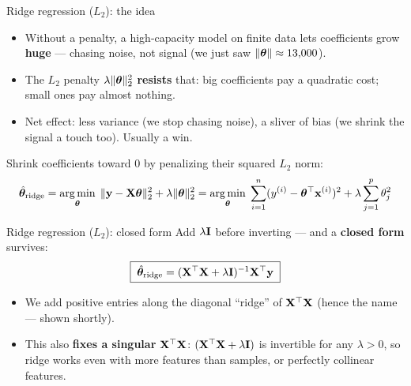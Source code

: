 \documentclass[aspectratio=169]{beamer}
\begin{document}
\begin{frame}{Ridge regression ($L_2$): the idea}
  \begin{itemize}
    \item Without a penalty, a high-capacity model on finite data lets coefficients grow \textbf{huge} --- chasing noise, not signal (we just saw $\|\bm{\theta}\| \approx 13{,}000$).
    \item The $L_2$ penalty $\lambda\|\bm{\theta}\|_2^2$ \textbf{resists} that: big coefficients pay a quadratic cost; small ones pay almost nothing.
    \item Net effect: less variance (we stop chasing noise), a sliver of bias (we shrink the signal a touch too). Usually a win.
  \end{itemize}
  \vfill
  Shrink coefficients toward $0$ by penalizing their squared $L_2$ norm:
  \[
    \hat{\bm{\theta}}_{\text{ridge}}
    = \mathop{\mathrm{arg\,min}}_{\bm{\theta}}\; \| \mathbf{y} - \mathbf{X} \bm{\theta} \|_2^2 + \lambda \|\bm{\theta}\|_2^2
    = \mathop{\mathrm{arg\,min}}_{\bm{\theta}}\; \sum_{i=1}^{n} (y^{(i)} - \bm{\theta}^\top \mathbf{x}^{(i)})^2 + \lambda \sum_{j=1}^p \theta_j^2
  \]
\end{frame}

\begin{frame}{Ridge regression ($L_2$): closed form}
  Add $\lambda\mathbf{I}$ before inverting --- and a \textbf{closed form} survives:
  \[
    \boxed{\;\hat{\bm{\theta}}_{\text{ridge}} = (\mathbf{X}^\top \mathbf{X} + \lambda \mathbf{I})^{-1} \mathbf{X}^\top \mathbf{y}\;}
  \]
  \begin{itemize}\small
    \item We add positive entries along the diagonal ``ridge'' of $\mathbf{X}^\top\mathbf{X}$ (hence the name --- shown shortly).
    \item This also \textbf{fixes a singular} $\mathbf{X}^\top\mathbf{X}$: $(\mathbf{X}^\top\mathbf{X} + \lambda\mathbf{I})$ is invertible for any $\lambda>0$, so ridge works even with more features than samples, or perfectly collinear features.
  \end{itemize}
  \vfill
\end{frame}
\end{document}
